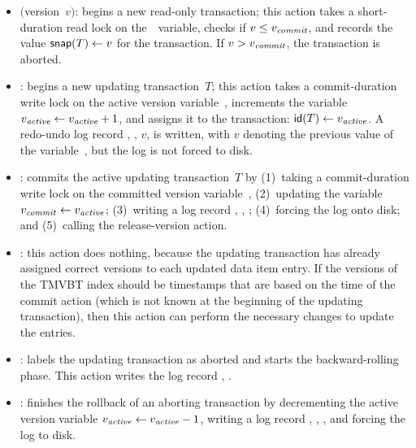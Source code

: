\begin{itemize}
  \setlength{\itemsep}{0pt}

  \item {}$($version~$v)$: begins a new read-only
  transaction; this action takes a short-duration read lock on the~\comver\
  variable, checks if $v \leq \smash{v_{\text{\textit{commit}}}}$, and records the value $\text{\textsf{snap}}(T)
  \leftarrow v$ for the transaction. 
  If $v > \smash{v_{\text{\textit{commit}}}}$, the transaction is aborted.
 
  \item {}: begins a new updating transaction~$T$; this
  action takes a commit-duration write lock on the active version
  variable~\actver, increments the variable $\smash{v_{\text{\textit{active}}}} \leftarrow \smash{v_{\text{\textit{active}}}} +
  1$, and assigns it to the transaction: $\text{\textsf{id}}(T) \leftarrow \smash{v_{\text{\textit{active}}}}$.
  A redo-undo log record \lrb{T}, \logact{begin}, $v$, \lre{\actver} is
  written, with $v$ denoting the previous value of the variable~\actver,
  but the log is not forced to disk. 

  \item {}: commits the active updating transaction~$T$ 
  by  
  (1)~taking a commit-duration write lock on the committed version 
  variable~\comver, 
  (2)~updating the variable $\smash{v_{\text{\textit{commit}}}} \leftarrow \smash{v_{\text{\textit{active}}}}$; 
  (3)~writing a log record , , \lre{\comver}; 
  (4)~forcing the log onto disk; and
  (5)~calling the release-version action.

  \item {}: this action does nothing, because the
  updating transaction has already assigned correct versions to each updated
  data item entry.
  If the versions of the TMVBT index should be timestamps that are based on
  the time of the commit action (which is not known at the beginning of the
  updating transaction), then this action can perform the necessary changes
  to update the entries.

  \item {}: labels the updating transaction as aborted and
  starts the backward-rolling phase.
  This action writes the log record , .

  \item {}: finishes the rollback of an aborting
  transaction by decrementing the active version variable $\smash{v_{\text{\textit{active}}}} \leftarrow
  \smash{v_{\text{\textit{active}}}} - 1$, writing a log record
  , , \lre{\actver}, and 
  forcing the log to disk.

\end{itemize}
 
